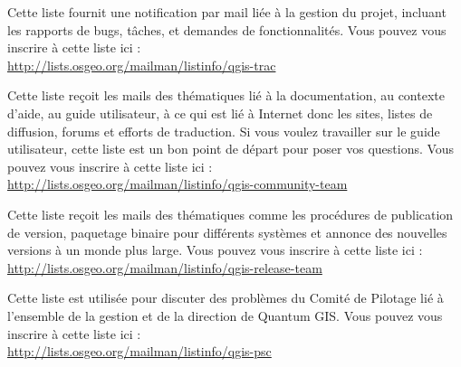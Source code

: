 Cette liste fournit une notification par mail liée à la gestion du projet,
incluant les rapports de bugs, tâches, et demandes de fonctionnalités. Vous
pouvez vous inscrire à cette liste ici :\\
\url{http://lists.osgeo.org/mailman/listinfo/qgis-trac}

Cette liste reçoit les mails des thématiques lié à la documentation, au
contexte d'aide, au guide utilisateur, à ce qui est lié à Internet donc les
sites, listes de diffusion, forums et efforts de traduction. Si vous voulez
travailler sur le guide utilisateur, cette liste est un bon point de départ
pour poser vos questions. Vous pouvez vous inscrire à cette liste ici :\\
\url{http://lists.osgeo.org/mailman/listinfo/qgis-community-team}

Cette liste reçoit les mails des thématiques comme les procédures de
publication de version, paquetage binaire pour différents systèmes et annonce
des nouvelles versions à un monde plus large. Vous pouvez vous inscrire à cette
liste ici :\\
\url{http://lists.osgeo.org/mailman/listinfo/qgis-release-team}

Cette liste est utilisée pour discuter des problèmes du Comité de Pilotage lié à
l'ensemble de la gestion et de la direction de Quantum GIS. Vous pouvez vous
inscrire à cette liste ici :\\
\url{http://lists.osgeo.org/mailman/listinfo/qgis-psc}

